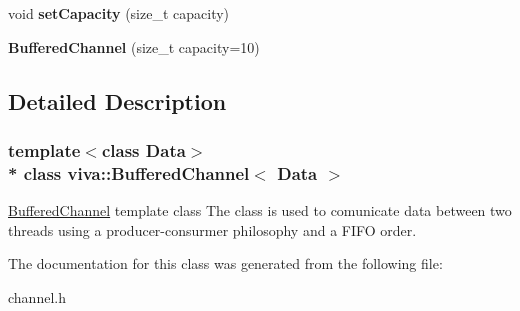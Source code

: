 \begin{DoxyCompactItemize}
\item 
void {\bfseries set\+Capacity} (size\+\_\+t capacity)\hypertarget{classviva_1_1_buffered_channel_ab20815aa0e3917608c7bbb21c6361c4d}{}\label{classviva_1_1_buffered_channel_ab20815aa0e3917608c7bbb21c6361c4d}

\item 
{\bfseries Buffered\+Channel} (size\+\_\+t capacity=10)\hypertarget{classviva_1_1_buffered_channel_ab07244a97c5ce0347fd8cf8a89dd9512}{}\label{classviva_1_1_buffered_channel_ab07244a97c5ce0347fd8cf8a89dd9512}

\end{DoxyCompactItemize}


\subsection{Detailed Description}
\subsubsection*{template$<$class Data$>$\\*
class viva\+::\+Buffered\+Channel$<$ Data $>$}

\hyperlink{classviva_1_1_buffered_channel}{Buffered\+Channel} template class The class is used to comunicate data between two threads using a producer-\/consurmer philosophy and a F\+I\+FO order. 

The documentation for this class was generated from the following file\+:\begin{DoxyCompactItemize}
\item 
channel.\+h\end{DoxyCompactItemize}
